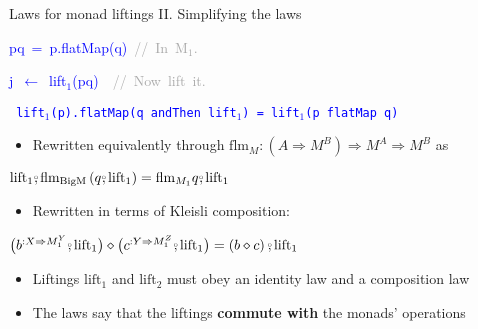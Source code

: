 \documentclass[english]{beamer}
\newenvironment{lyxcode}
  {\par\begin{list}{}{
    \setlength{\rightmargin}{\leftmargin}
    \setlength{\listparindent}{0pt}%
    \raggedright
    \setlength{\itemsep}{0pt}
    \setlength{\parsep}{0pt}
    \normalfont\ttfamily}%
   \def\{{\char`\{}
   \def\}{\char`\}}
   \def\textasciitilde{\char`\~}
   \item[]}
  {\end{list}}
\newcommand{\bef}{\ensuremath\raisebox{2pt}{$\mathsmaller{\mathsmaller{\circ}}$}\hspace{-3.3pt},}
\begin{document}
\begin{frame}{Laws for monad liftings II. Simplifying the laws}
\begin{minipage}[t]{0.5\columnwidth}
\begin{lyxcode}
\textcolor{blue}{\footnotesize{}pq~=~p.flatMap(q)~}\textrm{\textcolor{darkgray}{\footnotesize{}//~In~M$_{1}$.}}{\footnotesize\par}

\textcolor{blue}{\footnotesize{}j~$\leftarrow$~lift$_{1}$(pq)}\textrm{\textcolor{darkgray}{\footnotesize{}~~//~Now~lift~it.}}{\footnotesize\par}
\end{lyxcode}
%
\end{minipage}\texttt{\textcolor{blue}{\footnotesize{}\medskip{}
lift$_{1}$(p).flatMap(q andThen lift$_{1}$) = lift$_{1}$(p flatMap
q)}}{\footnotesize\par}
\begin{itemize}
\item Rewritten equivalently through $\text{flm}_{M}:\left(A\Rightarrow M^{B}\right)\Rightarrow M^{A}\Rightarrow M^{B}$
as
\end{itemize}
\begin{center}
{\footnotesize{}\vspace{-0.2cm}\hspace{-0.0cm}$\text{lift}_{1}\bef\text{flm}_{\text{BigM}}\left(q\bef\text{lift}_{1}\right)=\text{flm}_{M_{1}}q\bef\text{lift}_{1}$}{\footnotesize\par}
\par\end{center}
\begin{itemize}
\item {\footnotesize{}\vspace{-0.2cm}\hspace{-0.0cm}}Rewritten in terms
of Kleisli composition:
\end{itemize}
\begin{center}
{\footnotesize{}\vspace{-0.2cm}\hspace{-0.0cm}$\big(b^{:X\Rightarrow M_{1}^{Y}}\bef\text{lift}_{1}\big)\diamond\big(c^{:Y\Rightarrow M_{1}^{Z}}\bef\text{lift}_{1}\big)=\left(b\diamond c\right)\bef\text{lift}_{1}$}{\footnotesize\par}
\par\end{center}
\begin{itemize}
\item {\footnotesize{}\vspace{-0.3cm}\hspace{-0.0cm}}Liftings $\text{lift}_{1}$
and $\text{lift}_{2}$ must obey an identity law and a composition
law
\item The laws say that the liftings \textbf{commute with} the monads' operations
\end{itemize}
\end{frame}
\end{document}
